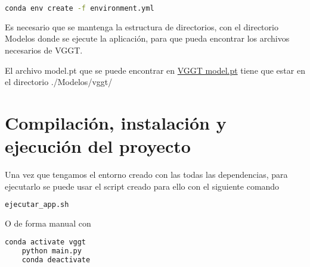 \begin{lstlisting}[language=bash]
	conda env create -f environment.yml
\end{lstlisting}

Es necesario que se mantenga la estructura de directorios, con el directorio Modelos donde se ejecute la aplicación, para que pueda encontrar los archivos necesarios de VGGT.

El archivo model.pt que se puede encontrar en \href{https://huggingface.co/facebook/VGGT-1B/blob/main/model.pt}{VGGT model.pt} tiene que estar en el directorio ./Modelos/vggt/

\section{Compilación, instalación y ejecución del proyecto}
Una vez que tengamos el entorno creado con las todas las dependencias, para ejecutarlo se puede usar el script creado para ello con el siguiente comando

\begin{lstlisting}[language=bash]
	ejecutar_app.sh
\end{lstlisting}

O de forma manual con 
\begin{lstlisting}[language=bash]
	conda activate vggt
	python main.py
	conda deactivate
\end{lstlisting}
